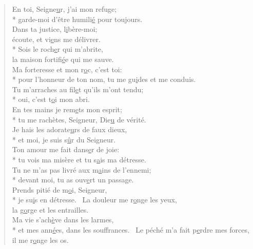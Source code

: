 
\begin{verse}
En toi, Seigne\underline{u}r, j’ai mon refuge; \\*
garde-moi d’être humili\underline{é} pour toujours. \\

Dans ta justice, l\underline{i}bère-moi; \\
écoute, et vi\underline{e}ns me délivrer. \\*
Sois le roch\underline{e}r qui m’abrite, \\
la maison fortifi\underline{é}e qui me sauve. \\

Ma forteresse et mon r\underline{o}c, c’est toi: \\*
pour l’honneur de ton nom, tu me gu\underline{i}des et me conduis. \\
Tu m’arraches au fil\underline{e}t qu’ils m’ont tendu; \\*
oui, c’est t\underline{o}i mon abri. \\

En tes mains je rem\underline{e}ts mon esprit; \\*
tu me rachètes, Seigneur, Die\underline{u} de vérité. \\
Je hais les adorate\underline{u}rs de faux dieux, \\*
et moi, je suis s\underline{û}r du Seigneur. \\

Ton amour me fait dans\underline{e}r de joie: \\*
tu vois ma misère et tu s\underline{a}is ma détresse. \\
Tu ne m’as pas livré aux m\underline{a}ins de l’ennemi; \\*
devant moi, tu as ouv\underline{e}rt un passage. \\

Prends pitié de m\underline{o}i, Seigneur, \\*
je su\underline{i}s en détresse.~\psalmstar
La douleur me r\underline{o}nge les yeux, \\
la g\underline{o}rge et les entrailles. \\

Ma vie s’ach\underline{è}ve dans les larmes, \\*
et mes ann\underline{é}es, dans les souffrances.~\psalmstar
Le péché m’a fait p\underline{e}rdre mes forces, \\
il me r\underline{o}nge les os. \\


\end{verse}
